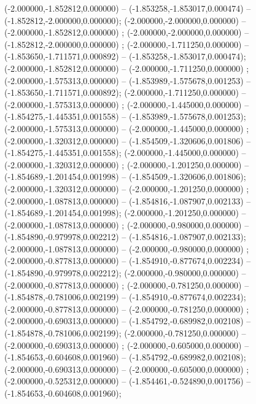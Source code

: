  (-2.000000,-1.852812,0.000000) -- (-1.853258,-1.853017,0.000474) -- (-1.852812,-2.000000,0.000000);
 (-2.000000,-2.000000,0.000000) -- (-2.000000,-1.852812,0.000000) ;
 (-2.000000,-2.000000,0.000000) -- (-1.852812,-2.000000,0.000000) ;
 (-2.000000,-1.711250,0.000000) -- (-1.853650,-1.711571,0.000892) -- (-1.853258,-1.853017,0.000474);
 (-2.000000,-1.852812,0.000000) -- (-2.000000,-1.711250,0.000000) ;
 (-2.000000,-1.575313,0.000000) -- (-1.853989,-1.575678,0.001253) -- (-1.853650,-1.711571,0.000892);
 (-2.000000,-1.711250,0.000000) -- (-2.000000,-1.575313,0.000000) ;
 (-2.000000,-1.445000,0.000000) -- (-1.854275,-1.445351,0.001558) -- (-1.853989,-1.575678,0.001253);
 (-2.000000,-1.575313,0.000000) -- (-2.000000,-1.445000,0.000000) ;
 (-2.000000,-1.320312,0.000000) -- (-1.854509,-1.320606,0.001806) -- (-1.854275,-1.445351,0.001558);
 (-2.000000,-1.445000,0.000000) -- (-2.000000,-1.320312,0.000000) ;
 (-2.000000,-1.201250,0.000000) -- (-1.854689,-1.201454,0.001998) -- (-1.854509,-1.320606,0.001806);
 (-2.000000,-1.320312,0.000000) -- (-2.000000,-1.201250,0.000000) ;
 (-2.000000,-1.087813,0.000000) -- (-1.854816,-1.087907,0.002133) -- (-1.854689,-1.201454,0.001998);
 (-2.000000,-1.201250,0.000000) -- (-2.000000,-1.087813,0.000000) ;
 (-2.000000,-0.980000,0.000000) -- (-1.854890,-0.979978,0.002212) -- (-1.854816,-1.087907,0.002133);
 (-2.000000,-1.087813,0.000000) -- (-2.000000,-0.980000,0.000000) ;
 (-2.000000,-0.877813,0.000000) -- (-1.854910,-0.877674,0.002234) -- (-1.854890,-0.979978,0.002212);
 (-2.000000,-0.980000,0.000000) -- (-2.000000,-0.877813,0.000000) ;
 (-2.000000,-0.781250,0.000000) -- (-1.854878,-0.781006,0.002199) -- (-1.854910,-0.877674,0.002234);
 (-2.000000,-0.877813,0.000000) -- (-2.000000,-0.781250,0.000000) ;
 (-2.000000,-0.690313,0.000000) -- (-1.854792,-0.689982,0.002108) -- (-1.854878,-0.781006,0.002199);
 (-2.000000,-0.781250,0.000000) -- (-2.000000,-0.690313,0.000000) ;
 (-2.000000,-0.605000,0.000000) -- (-1.854653,-0.604608,0.001960) -- (-1.854792,-0.689982,0.002108);
 (-2.000000,-0.690313,0.000000) -- (-2.000000,-0.605000,0.000000) ;
 (-2.000000,-0.525312,0.000000) -- (-1.854461,-0.524890,0.001756) -- (-1.854653,-0.604608,0.001960);
